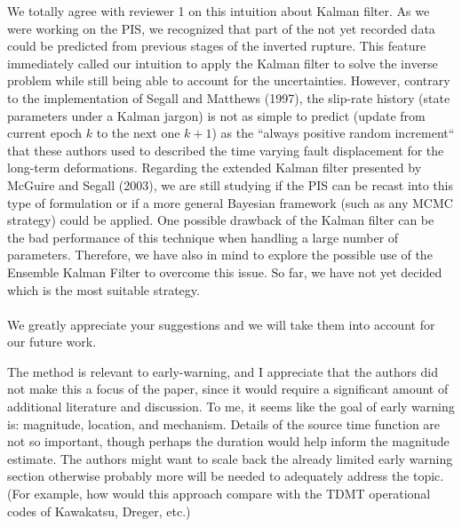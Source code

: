 \documentclass[10pt]{extarticle}
\begin{document}
\begin{Answer}
 We totally agree with reviewer 1 on this intuition about Kalman filter. As we were working 
 on the PIS, we recognized that part of the not yet recorded data could be predicted from previous 
 stages of the inverted rupture. This feature immediately called our intuition to apply the Kalman filter to 
 solve the inverse problem while still being able to account for the uncertainties. 
 However, contrary to the implementation of Segall and Matthews (1997), the slip-rate history 
 (state parameters under a Kalman jargon) is not as simple to predict (update from current 
 epoch $k$ to the next one $k+1$) as the ``always positive random increment`` that these authors 
 used to described the time varying fault displacement for the long-term deformations. 
 Regarding the extended Kalman filter presented by McGuire and Segall (2003), we are still 
 studying if the PIS can be recast into this type of formulation or if a more general 
 Bayesian framework (such as any MCMC strategy) could be applied. One possible drawback 
 of the Kalman filter can be the bad performance of this technique when handling a large 
 number of parameters. Therefore, we have also in mind to explore the possible use of 
 the Ensemble Kalman Filter to overcome this issue. So far, we have not yet decided 
 which is the most suitable strategy.\\
 \\ 
 We greatly appreciate your suggestions and we will take them into account for our future work.
 \WorkInProgressRevTask
\end{Answer}
%
%
\begin{ReviewerComment}{1}
\noindent 
 The method is relevant to early-warning, and I appreciate that the authors did not make
 this a focus of the paper, since it would require a significant amount of additional literature
 and discussion. To me, it seems like the goal of early warning is: magnitude, location,
 and mechanism. Details of the source time function are not so important, though perhaps
 the duration would help inform the magnitude estimate. The authors might want to scale
 back the already limited early warning section \textemdash otherwise probably more will be needed to
 adequately address the topic.
 (For example, how would this approach compare with the TDMT operational codes of
 Kawakatsu, Dreger, etc.)
\end{ReviewerComment}
%
\end{document}

